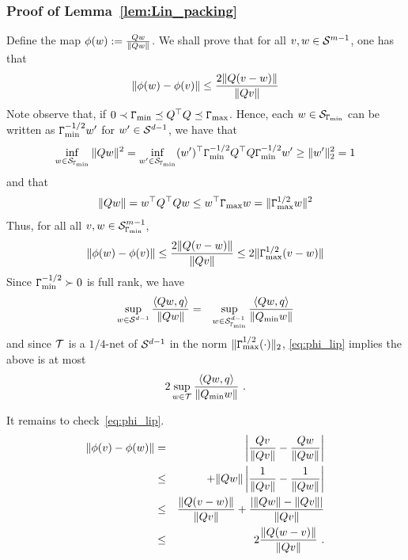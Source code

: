 \subsubsection{Proof of Lemma~\ref{lem:Lin_packing}\label{sec:proof_lem_lin_pack}}
Define the map $\phi(w):= \frac{Q w}{\|Q w\|}$. We shall prove that for all $v,w \in \mathcal{S}^{m-1}$, one has that
\begin{eqnarray}\label{eq:phi_lip}
\|\phi(w) - \phi(v)\| \le \frac{2\|Q(v-w)\|}{\|Qv\|}
\end{eqnarray}
Note observe that, if $0 \prec \mathtt{\Gamma}_{\min} \preceq Q^\top Q \preceq \mathtt{\Gamma}_{\max}$. Hence, each $w \in \mathcal{S}_{\mathtt{\Gamma}_{\min}}$ can be written as $\mathtt{\Gamma}_{\min}^{-1/2}w'$ for $w' \in \mathcal{S}^{d-1}$, we have that
\begin{eqnarray*}
\inf_{w \in \mathcal{S}_{\mathtt{\Gamma}_{\min}}} \|Qw\|^2 = \inf_{w' \in \mathcal{S}_{\mathtt{\Gamma}_{\min}}} (w')^\top \mathtt{\Gamma}_{\min}^{-1/2}Q^\top Q \mathtt{\Gamma}_{\min}^{-1/2} w' \ge \|w'\|_2^2 = 1
\end{eqnarray*}
 and that 
 \begin{eqnarray}
 \|Qw\| = w^\top Q^\top Q w \le w^\top \mathtt{\Gamma}_{\max} w  = \|\mathtt{\Gamma}_{\max}^{1/2} w\|^2
 \end{eqnarray}
Thus, for all all $v,w \in \mathcal{S}_{\mathtt{\Gamma}_{\min}}^{m-1}$,
\begin{eqnarray*}
\|\phi(w) - \phi(v)\| \le \frac{2\|Q(v-w)\|}{\|Qv\|} \le 2\|\mathtt{\Gamma}_{\max}^{1/2}(v-w)\| 
\end{eqnarray*}
Since $\mathtt{\Gamma}_{\min}^{-1/2} \succ 0$ is full rank, we have
\begin{eqnarray*}
	\sup_{w \in \mathcal{S}^{d-1}} \frac{ \langle Q w,  q \rangle}{\|Q w\|} &=&  \sup_{w \in \mathcal{S}_{\mathtt{\Gamma}_{\min}}^{d-1}} \frac{ \langle Q w,  q \rangle}{\|Q_{\min} w\|}\\
\end{eqnarray*}
and since $\mathcal{T}$ is a $1/4$-net of $\mathcal{S}^{d-1}$ in the norm $\|\mathtt{\Gamma}_{\max}^{1/2}(\cdot)\|_2$, \eqref{eq:phi_lip} implies the above is at most
\begin{eqnarray*}
2\sup_{w \in \mathcal{T}} \frac{ \langle Q w,  q \rangle}{\|Q_{\min} w\|}~.
\end{eqnarray*}

	It remains to check~\eqref{eq:phi_lip}. 
	\begin{eqnarray*}
	\|\phi(v) - \phi(w)\| &=& \left|\frac{{Q}v}{\|{Q}v\|} - \frac{{Q}w}{\|{Q}w\|}\right|\\
	&\le&  + \|{Q}w\|\left|\frac{1}{\|Q v\|} - \frac{1}{\|Q w\| }\right|\\
	&\le& \frac{\|{Q}(v - w)\|}{\|{Q}v\|} +\frac{|\|{Q}w\|-\|Q v\||}{\|{Q}v\|}\\
	&\le& 2\frac{\|{Q}(w-v)\|}{\|{Q}v\|}~.\\
	\end{eqnarray*}
